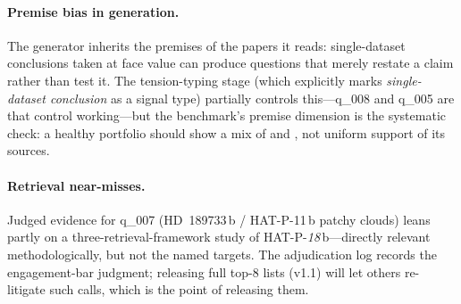 \paragraph{Premise bias in generation.} The generator inherits the
premises of the papers it reads: single-dataset conclusions taken at
face value can produce questions that merely restate a claim rather
than test it. The tension-typing stage (which explicitly marks
\emph{single-dataset conclusion} as a signal type) partially controls
this---q\_008 and q\_005 are that control working---but the benchmark's
premise dimension is the systematic check: a healthy portfolio should
show a mix of  and , not uniform
support of its sources.

\paragraph{Retrieval near-misses.} Judged evidence for q\_007
(HD~189733\,b / HAT-P-11\,b patchy clouds) leans partly on a
three-retrieval-framework study of HAT-P-\emph{18}\,b---directly
relevant methodologically, but not the named targets. The adjudication
log records the engagement-bar judgment; releasing full top-8 lists
(v1.1) will let others re-litigate such calls, which is the point of
releasing them.
